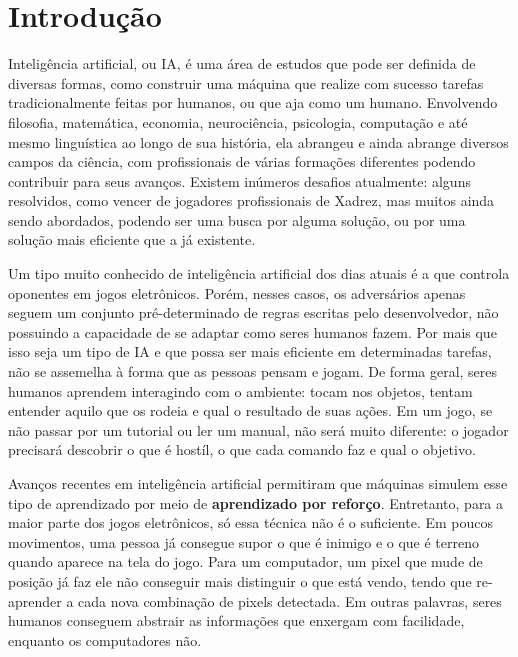 \chapter{Introdução}
\label{cap:introducao}

Inteligência artificial, ou IA, é uma área de estudos que pode ser definida de diversas formas, como construir uma máquina que realize com sucesso tarefas tradicionalmente feitas por humanos, ou que aja como um humano.
Envolvendo filosofia, matemática, economia, neurociência, psicologia, computação e até mesmo linguística ao longo de sua história, ela abrangeu e ainda abrange diversos campos da ciência, com profissionais de várias formações diferentes podendo contribuir para seus avanços.
Existem inúmeros desafios atualmente: alguns resolvidos, como vencer de jogadores profissionais de Xadrez, mas muitos ainda sendo abordados, podendo ser uma busca por alguma solução, ou por uma solução mais eficiente que a já existente.

Um tipo muito conhecido de inteligência artificial dos dias atuais é a que controla oponentes em jogos eletrônicos.
Porém, nesses casos, os adversários apenas seguem um conjunto pré-determinado de regras escritas pelo desenvolvedor, não possuindo a capacidade de se adaptar como seres humanos fazem.
Por mais que isso seja um tipo de IA e que possa ser mais eficiente em determinadas tarefas, não se assemelha à forma que as pessoas pensam e jogam.
De forma geral, seres humanos aprendem interagindo com o ambiente: tocam nos objetos, tentam entender aquilo que os rodeia e qual o resultado de suas ações.
Em um jogo, se não passar por um tutorial ou ler um manual, não será muito diferente: o jogador precisará descobrir o que é hostíl, o que cada comando faz e qual o objetivo.

Avanços recentes em inteligência artificial permitiram que máquinas simulem esse tipo de aprendizado por meio de \textbf{aprendizado por reforço}.
Entretanto, para a maior parte dos jogos eletrônicos, só essa técnica não é o suficiente.
Em poucos movimentos, uma pessoa já consegue supor o que é inimigo e o que é terreno quando aparece na tela do jogo.
Para um computador, um pixel que mude de posição já faz ele não conseguir mais distinguir o que está vendo, tendo que re-aprender a cada nova combinação de pixels detectada.
Em outras palavras, seres humanos conseguem abstrair as informações que enxergam com facilidade, enquanto os computadores não.

